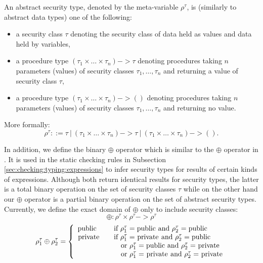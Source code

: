 \documentclass[a4paper, 10pt, draft]{report}
\newcommand{\mycode}[1]{\ensuremath{\mbox{\lstinline{#1}}}}
\begin{document}
An abstract security type, denoted by the meta-variable $\rho^\tau$, is
(similarly to abstract data types) one of the following:
\begin{itemize}
  \item 
  a security class $\tau$ denoting the security class of data held as values
  and data held by variables,
  
  \item
  a procedure type $\left(\tau_1 \times \ldots \times \tau_n\right) -> \tau$
  denoting procedures taking $n$ parameters (values) of security classes
  $\tau_1,\ldots,\tau_n$ and returning a value of security class $\tau$,

  \item
  a procedure type $\left(\tau_1 \times \ldots \times \tau_n\right) -> ()$
  denoting procedures taking $n$ parameters (values) of security classes
  $\tau_1,\ldots,\tau_n$ and returning no value.
\end{itemize}
More formally:
\[ \rho^\tau ::= \tau\ |\ \left(\tau_1 \times \ldots \times \tau_n\right) -> \tau\ |\ \left(\tau_1 \times \ldots \times \tau_n\right) -> (). \]

In addition, we define the binary $\oplus$ operator which is similar to the
$\oplus$ operator in \cite{DENNING76}. It is used in the static checking rules
in Subsection \ref{sec:checking:typing:expressions} to infer security types for
results of certain kinds of expressions. Although both return identical results
for security types, the latter is a total binary operation on the set of
security classes $\tau$ while on the other hand our $\oplus$ operator is a
partial binary operation on the set of abstract security types. Currently, we
define the exact domain of $\oplus$ only to include security classes:
\[
  \oplus : \rho^\tau \times \rho^\tau -> \rho^\tau
\]\[
  \rho^\tau_1 \oplus \rho^\tau_2 = \left\{\begin{array}{ll}
    \mycode{public}  &
      \quad \text{if $\rho^\tau_1 = \mycode{public}$ and $\rho^\tau_2 = \mycode{public}$} \\
    \mycode{private} &
      \quad \text{if $\rho^\tau_1 = \mycode{private}$ and $\rho^\tau_2 = \mycode{public}$} \\
      & \qquad \text{or $\rho^\tau_1 = \mycode{public}$ and $\rho^\tau_2 = \mycode{private}$} \\
      & \qquad \text{or $\rho^\tau_1 = \mycode{private}$ and $\rho^\tau_2 = \mycode{private}$} \\
  \end{array}\right.
\]
\end{document}
